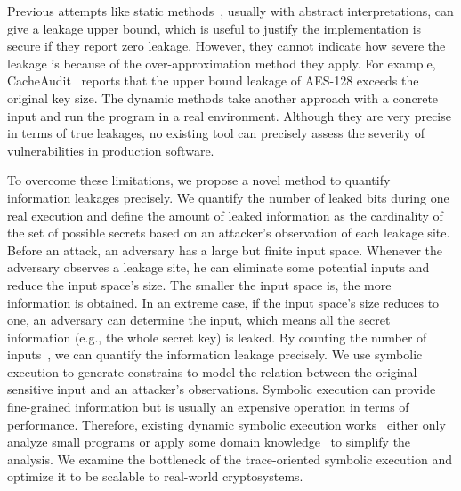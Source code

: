 Previous attempts like static methods~\cite{182946,5207642}, usually with
abstract interpretations, can give a leakage upper bound, which is useful to
justify the implementation is secure if they report zero leakage.
However, they cannot indicate how severe the leakage is because of the
over-approximation method they apply. For example, CacheAudit~\cite{182946} 
reports that the upper
bound leakage of AES-128 exceeds the original key size. The dynamic methods take
another approach with a concrete input and run the program in a real
environment. Although they are very precise in terms of true leakages, no
existing tool can precisely assess the severity of vulnerabilities in production
software. 

To overcome these limitations, we propose a novel method to quantify information 
leakages precisely. We quantify the number of leaked bits during one real 
execution and define the amount of leaked information as the cardinality of 
the set of possible secrets based on an attacker's observation of each leakage 
site. Before an attack, an adversary has a large but finite input space. 
Whenever the adversary observes a leakage site, he can eliminate some potential 
inputs and reduce the input space's size. The smaller the input space is, 
the more information is obtained. In an extreme case, if the input space's size 
reduces to one, an adversary can determine the input, 
which means all the secret information (e.g., the whole secret key) is
leaked. By counting the number of inputs~\cite{10.1007/11499107_24}, 
we can quantify the information leakage precisely.
We use symbolic execution to generate constrains to model the relation 
between the original sensitive input and an attacker's observations. 
Symbolic execution can provide fine-grained information but is usually an expensive
operation in terms of performance. Therefore, existing dynamic symbolic
execution works~\cite{203878,236338,Brotzman19Casym} either only analyze
small programs or apply some domain knowledge~\cite{203878} to simplify the analysis. We
examine the bottleneck of the trace-oriented symbolic execution and optimize it
to be scalable to real-world cryptosystems.

